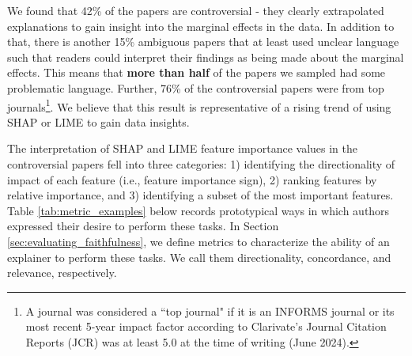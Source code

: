 \documentclass[12pt]{article}  %
\begin{document}
        We found that 42\% of the papers are controversial - they clearly extrapolated explanations to gain insight into the marginal effects in the data. In addition to that, there is another 15\% ambiguous papers that at least used unclear language such that readers could interpret their findings as being made about the marginal effects. This means that \textbf{more than half} of the papers we sampled had some problematic language. Further, 76\% of the controversial papers were from top journals\footnote{A journal was considered a ``top journal" if it is an INFORMS journal or its most recent 5-year impact factor according to Clarivate's Journal Citation Reports (JCR) was at least 5.0 at the time of writing (June 2024).}.
        We believe that this result is representative of a rising trend of using SHAP or LIME to gain data insights.

        The interpretation of SHAP and LIME feature importance values in the controversial papers fell into three categories: 1) identifying the directionality of impact of each feature (i.e., feature importance sign), 2) ranking features by relative importance, and 3) identifying a subset of the most important features. Table \ref{tab:metric_examples} below records prototypical ways in which authors expressed their desire to perform these tasks. In Section \ref{sec:evaluating_faithfulness}, we define metrics to characterize the ability of an explainer to perform these tasks. We call them directionality, concordance, and relevance, respectively. 
\end{document}
